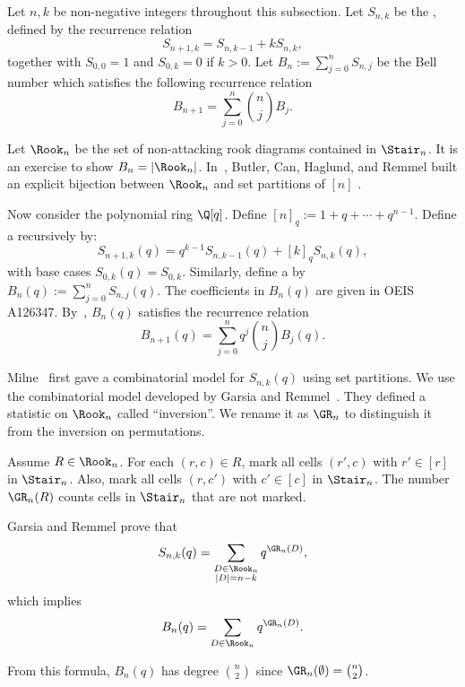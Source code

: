 Let $n, k$ be non-negative integers
throughout this subsection. 
Let $S_{n, k}$ be the ,
defined by the recurrence relation
$$
S_{n+1,k} = S_{n, k - 1} + k S_{n, k},
$$
together with $S_{0, 0} = 1$
and $S_{0,k} = 0$ if $k > 0$.
Let $B_n:= \sum_{j = 0}^n S_{n,j}$
be the Bell number
which satisfies the following recurrence relation
$$
B_{n + 1} = \sum_{j = 0}^n {\binom{n}{j}} B_j.
$$
 
Let $\Rook_n$ be the set 
of non-attacking rook diagrams contained 
in $\Stair_n$.
It is an exercise to show
$B_n = |\Rook_n|$.
In~\cite{BCHR},
Butler, Can, Haglund, and Remmel
built an explicit bijection between
$\Rook_n$ and set partitions of $[n]$ .

Now consider the polynomial ring $\Q[q]$.
Define $[n]_q := 1 + q + \cdots + q^{n-1}$.
Define a  recursively by:
$$
S_{n+1, k}(q) = q^{k-1} S_{n, k-1}(q) + [k]_q S_{n, k}(q),
$$
with base cases $S_{0, k}(q) = S_{0,k}$.
Similarly, define a  by $B_n(q) := \sum_{j = 0}^n S_{n,j}(q)$.
The coefficients in $B_{n}(q)$
are given in OEIS A126347.
By~\cite{Wa},
$B_n(q)$ satisfies the recurrence relation
$$
B_{n+1}(q) = \sum_{j = 0}^n q^j {\binom{n}{j}} B_j(q).
$$



Milne~\cite{Mil} first gave a combinatorial
model for $S_{n,k}(q)$ using set partitions. 
We use the combinatorial model
developed by Garsia and Remmel~\cite{GR}.
They defined a statistic on $\Rook_n$
called ``inversion''.
We rename it as $\GR_n$ to distinguish it 
from the inversion on permutations. 
\begin{defn}[\cite{GR}]
Assume $R \in \Rook_n$.
For each $(r,c) \in R$,
mark all cells $(r', c)$ with $r' \in [r]$ in $\Stair_n$.
Also, mark all cells $(r, c')$ with $c' \in [c]$ in $\Stair_n$.
The number $\GR_n(R)$ counts cells in $\Stair_n$
that are not marked. 
\end{defn}

Garsia and Remmel prove that
\begin{equation}
\label{EQ: GR Stirling}
S_{n,k}(q) = \sum_{\substack{D \in \Rook_{n}\\ |D| = n-k}} q^{\GR_n(D)},
\end{equation}
which implies
\begin{equation}
\label{EQ: GR Bell}
B_n(q) = \sum_{D \in \Rook_n} q^{\GR_n(D)}.
\end{equation}

From this formula, $B_n(q)$ has degree ${\binom{n}{2}}$
since $\GR_n(\emptyset) = {\binom{n}{2}}$.

